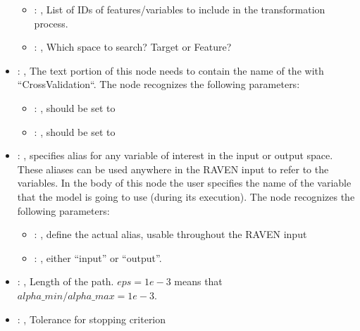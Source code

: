\begin{itemize}
\begin{itemize}
        \item {}: , 
          List of IDs of features/variables to include in the transformation process.

        \item {}: , 
          Which space to search? Target or Feature?
      \end{itemize}

    \item {}: , 
      The text portion of this node needs to contain the name of the  with
               ``CrossValidation``.
      The  node recognizes the following parameters:
        \begin{itemize}
          \item {}: , 
            should be set to 
          \item {}: , 
            should be set to 
      \end{itemize}

    \item {}: , 
      specifies alias for         any variable of interest in the input or output space. These
      aliases can be used anywhere in the RAVEN input to         refer to the variables. In the body
      of this node the user specifies the name of the variable that the model is going to use
      (during its execution).
      The  node recognizes the following parameters:
        \begin{itemize}
          \item {}: , 
            define the actual alias, usable throughout the RAVEN input
          \item {}: , 
            either ``input'' or ``output''.
      \end{itemize}

    \item {}: , 
      Length of the path. $eps=1e-3$ means that $alpha\_min / alpha\_max = 1e-3$.

    \item {}: , 
      Tolerance for stopping criterion


\end{itemize}
